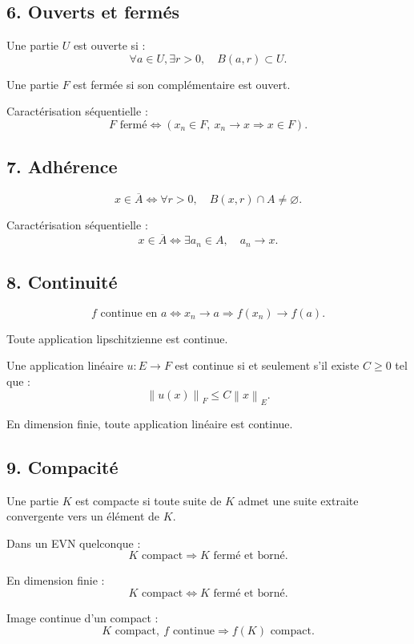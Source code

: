 \documentclass[11pt,a4paper]{article}
\newcommand{\norme}[1]{\left\lVert #1 \right\rVert}
\begin{document}
\subsection*{6. Ouverts et fermés}

Une partie \(U\) est ouverte si :
\[
\forall a\in U,\exists r>0,\quad B(a,r)\subset U.
\]

Une partie \(F\) est fermée si son complémentaire est ouvert.

Caractérisation séquentielle :
\[
F\text{ fermé}
\Longleftrightarrow
\left(x_n\in F,\ x_n\to x\Rightarrow x\in F\right).
\]

\subsection*{7. Adhérence}

\[
x\in\overline A
\Longleftrightarrow
\forall r>0,\quad B(x,r)\cap A\neq\varnothing.
\]

Caractérisation séquentielle :
\[
x\in\overline A
\Longleftrightarrow
\exists a_n\in A,\quad a_n\to x.
\]

\subsection*{8. Continuité}

\[
f\text{ continue en }a
\Longleftrightarrow
x_n\to a\Rightarrow f(x_n)\to f(a).
\]

Toute application lipschitzienne est continue.

Une application linéaire \(u:E\to F\) est continue si et seulement s'il existe \(C\geq0\) tel que :
\[
\norme{u(x)}_F\leq C\norme{x}_E.
\]

En dimension finie, toute application linéaire est continue.

\subsection*{9. Compacité}

Une partie \(K\) est compacte si toute suite de \(K\) admet une suite extraite convergente vers un élément de \(K\).

Dans un EVN quelconque :
\[
K\text{ compact}\Rightarrow K\text{ fermé et borné}.
\]

En dimension finie :
\[
K\text{ compact}
\Longleftrightarrow
K\text{ fermé et borné}.
\]

Image continue d'un compact :
\[
K\text{ compact},\ f\text{ continue}
\Rightarrow
f(K)\text{ compact}.
\]
\end{document}
